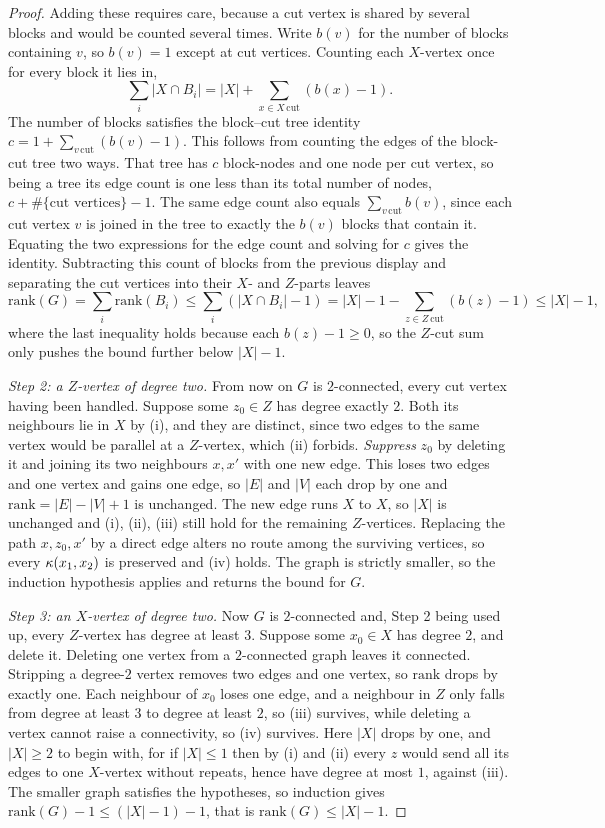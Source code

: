 \begin{proof}
Adding these requires care, because a cut vertex is shared by several blocks
and would be counted several times. Write $b(v)$ for the number of blocks
containing $v$, so $b(v) = 1$ except at cut vertices. Counting each
$X$-vertex once for every block it lies in,
\[
\sum_i |X \cap B_i| = |X| + \sum_{x \in X\,\mathrm{cut}} (b(x) - 1).
\]
The number of blocks satisfies the block--cut tree identity
$c = 1 + \sum_{v\,\mathrm{cut}} (b(v) - 1)$. This follows from counting the
edges of the block-cut tree two ways. That tree has $c$ block-nodes and one
node per cut vertex, so being a tree its edge count is one less than its
total number of nodes, $c + \#\{\text{cut vertices}\} - 1$. The same edge
count also equals $\sum_{v\,\mathrm{cut}} b(v)$, since each cut vertex $v$ is
joined in the tree to exactly the $b(v)$ blocks that contain it. Equating the
two expressions for the edge count and solving for $c$ gives the identity.
Subtracting this count of blocks from the
previous display and separating the cut vertices into their $X$- and
$Z$-parts leaves
\[
\mathrm{rank}(G) = \sum_i \mathrm{rank}(B_i) \le \sum_i (|X \cap B_i| - 1)
  = |X| - 1 - \sum_{z \in Z\,\mathrm{cut}} (b(z) - 1) \le |X| - 1,
\]
where the last inequality holds because each $b(z) - 1 \ge 0$, so the
$Z$-cut sum only pushes the bound further below $|X| - 1$.

\emph{Step 2: a $Z$-vertex of degree two.} From now on $G$ is $2$-connected,
every cut vertex having been handled. Suppose some $z_0 \in Z$ has degree
exactly $2$. Both its neighbours lie in $X$ by (i), and they are distinct,
since two edges to the same vertex would be parallel at a $Z$-vertex, which
(ii) forbids. \emph{Suppress} $z_0$ by deleting it and joining its two
neighbours $x, x'$ with one new edge. This loses two edges and one vertex
and gains one edge, so $|E|$ and $|V|$ each drop by one and
$\mathrm{rank} = |E| - |V| + 1$ is unchanged. The new edge runs $X$ to $X$,
so $|X|$ is unchanged and (i), (ii), (iii) still hold for the remaining
$Z$-vertices. Replacing the path $x, z_0, x'$ by a direct edge alters no
route among the surviving vertices, so every $\kappa(x_1, x_2)$ is preserved
and (iv) holds. The graph is strictly smaller, so the induction hypothesis
applies and returns the bound for $G$.

\emph{Step 3: an $X$-vertex of degree two.} Now $G$ is $2$-connected and,
Step 2 being used up, every $Z$-vertex has degree at least $3$. Suppose some
$x_0 \in X$ has degree $2$, and delete it. Deleting one vertex from a
$2$-connected graph leaves it connected. Stripping a degree-$2$ vertex
removes two edges and one vertex, so $\mathrm{rank}$ drops by exactly one.
Each neighbour of $x_0$ loses one edge, and a neighbour in $Z$ only falls
from degree at least $3$ to degree at least $2$, so (iii) survives, while
deleting a vertex cannot raise a connectivity, so (iv) survives. Here $|X|$
drops by one, and $|X| \ge 2$ to begin with, for if $|X| \le 1$ then by (i)
and (ii) every $z$ would send all its edges to one $X$-vertex without
repeats, hence have degree at most $1$, against (iii). The smaller graph
satisfies the hypotheses, so induction gives
$\mathrm{rank}(G) - 1 \le (|X| - 1) - 1$, that is $\mathrm{rank}(G) \le |X| - 1$.


\end{proof}
